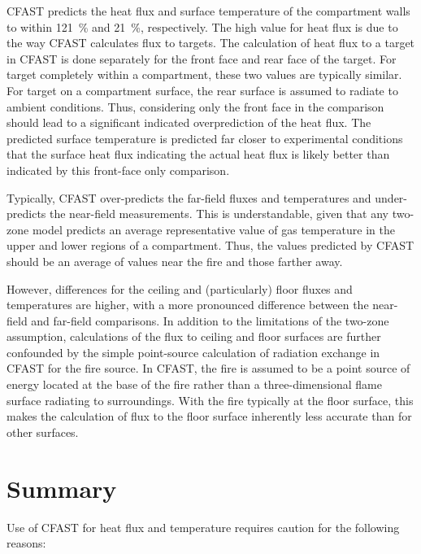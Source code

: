 CFAST predicts the heat flux and surface temperature of the compartment walls to within 121~\% and 21~\%, respectively.  The high value for heat flux is due to the way CFAST calculates flux to targets.  The calculation of heat flux to a target in CFAST is done separately for the front face and rear face of the target.  For target completely within a compartment, these two values are typically similar.  For target on a compartment surface, the rear surface is assumed to radiate to ambient conditions.  Thus, considering only the front face in the comparison should lead to a significant  indicated overprediction of the heat flux. The predicted surface temperature is predicted far closer to experimental conditions that the surface heat flux indicating the actual heat flux is likely better than indicated by this front-face only comparison. 

Typically, CFAST over-predicts the far-field fluxes and temperatures and under-predicts the near-field measurements.  This is understandable, given that any two-zone model predicts an average representative value of gas temperature in the upper and lower regions of a compartment.  Thus, the values predicted by CFAST should be an average of values near the fire and those farther away.

However, differences for the ceiling and (particularly) floor fluxes and temperatures are higher, with a more pronounced difference between the near-field and far-field comparisons.  In addition to the limitations of the two-zone assumption, calculations of the flux to ceiling and floor surfaces are further confounded by the simple point-source calculation of radiation exchange in CFAST for the fire source.  In CFAST, the fire is assumed to be a point source of energy located at the base of the fire rather than a three-dimensional flame surface radiating to surroundings.  With the fire typically at the floor surface, this makes the calculation of flux to the floor surface inherently less accurate than for other surfaces.

\section{Summary}

Use of CFAST for heat flux and temperature requires caution for the following reasons:

